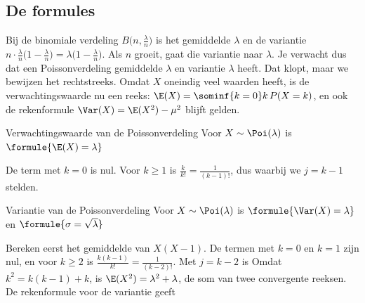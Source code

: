 \subsection{De formules}

Bij de binomiale verdeling $B\bigl(n, \frac{\lambda}{n}\bigr)$ is het gemiddelde $\lambda$ en de variantie $n \cdot \frac{\lambda}{n}\bigl(1 - \frac{\lambda}{n}\bigr) = \lambda\bigl(1 - \frac{\lambda}{n}\bigr)$. Als $n$ groeit, gaat die variantie naar $\lambda$. Je verwacht dus dat een Poissonverdeling gemiddelde $\lambda$ en variantie $\lambda$ heeft. Dat klopt, maar we bewijzen het rechtstreeks. Omdat $X$ oneindig veel waarden heeft, is de verwachtingswaarde nu een reeks: $\E(X) = \sominf{k=0} k \, P(X = k)$, en ook de rekenformule $\Var(X) = \E(X^2) - \mu^2$ blijft gelden.

\begin{theorie}
\begin{stelling}{Verwachtingswaarde van de Poissonverdeling}
Voor $X \sim \Poi(\lambda)$ is \quad $\formule{\E(X) = \lambda}$
\end{stelling}

\begin{bewijs}
De term met $k = 0$ is nul. Voor $k \geqslant 1$ is $\frac{k}{k!} = \frac{1}{(k - 1)!}$, dus
waarbij we $j = k - 1$ stelden.
\end{bewijs}

\begin{stelling}{Variantie van de Poissonverdeling}
Voor $X \sim \Poi(\lambda)$ is \quad $\formule{\Var(X) = \lambda}$ \quad en \quad $\formule{\sigma = \sqrt{\lambda}}$
\end{stelling}

\begin{bewijs}
Bereken eerst het gemiddelde van $X(X - 1)$. De termen met $k = 0$ en $k = 1$ zijn nul, en voor $k \geqslant 2$ is $\frac{k(k - 1)}{k!} = \frac{1}{(k - 2)!}$. Met $j = k - 2$ is
Omdat $k^2 = k(k - 1) + k$, is $\E(X^2) = \lambda^2 + \lambda$, de som van twee convergente reeksen. De rekenformule voor de variantie geeft
\end{bewijs}
\end{theorie}

